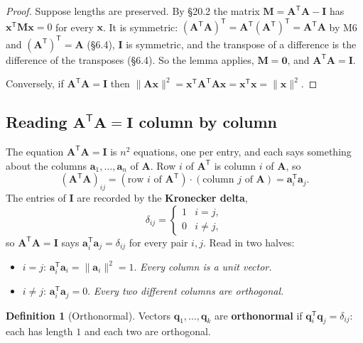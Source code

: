 \documentclass[11pt]{article}
\theoremstyle{plain}
\theoremstyle{definition}
\newtheorem{defn}{Definition}[section]
\theoremstyle{remark}
\newcommand{\vc}[1]{\mathbf{#1}}
\newcommand{\mt}[1]{\mathbf{#1}}
\newcommand{\norm}[1]{\lVert #1\rVert}
\newcommand{\T}{^{\mathsf{T}}}
\begin{document}
\begin{proof}
Suppose lengths are preserved. By \S20.2 the matrix
$\mt{M}=\mt{A}\T\mt{A}-\mt{I}$ has $\vc{x}\T\mt{M}\vc{x}=0$ for every
$\vc{x}$. It is symmetric: $(\mt{A}\T\mt{A})\T=\mt{A}\T(\mt{A}\T)\T=\mt{A}\T\mt{A}$
by M6 and $(\mt{A}\T)\T=\mt{A}$ (\S6.4), $\mt{I}$ is symmetric, and the
transpose of a difference is the difference of the transposes (\S6.4). So the
lemma applies, $\mt{M}=\mt{0}$, and $\mt{A}\T\mt{A}=\mt{I}$.

Conversely, if $\mt{A}\T\mt{A}=\mt{I}$ then
$\norm{\mt{A}\vc{x}}^{2}=\vc{x}\T\mt{A}\T\mt{A}\vc{x}=\vc{x}\T\vc{x}=\norm{\vc{x}}^{2}$.
\end{proof}

\subsection{Reading \texorpdfstring{$\mt{A}\T\mt{A}=\mt{I}$}{A'A = I} column by column}
The equation $\mt{A}\T\mt{A}=\mt{I}$ is $n^{2}$ equations, one per entry, and
each says something about the columns $\vc{a}_1,\dots,\vc{a}_n$ of $\mt{A}$.
Row $i$ of $\mt{A}\T$ is column $i$ of $\mt{A}$, so
\[
  (\mt{A}\T\mt{A})_{ij}
  =(\text{row } i \text{ of } \mt{A}\T)\cdot(\text{column } j \text{ of } \mt{A})
  =\vc{a}_i\T\vc{a}_j .
\]
The entries of $\mt{I}$ are recorded by the \textbf{Kronecker delta},
\[
  \delta_{ij}=\begin{cases}1 & i=j,\\ 0 & i\neq j,\end{cases}
\]
so $\mt{A}\T\mt{A}=\mt{I}$ says $\vc{a}_i\T\vc{a}_j=\delta_{ij}$ for every pair
$i,j$. Read in two halves:
\begin{itemize}[leftmargin=1.4em,itemsep=3pt]
  \item $i=j$: $\vc{a}_i\T\vc{a}_i=\norm{\vc{a}_i}^{2}=1$. \emph{Every column is
        a unit vector.}
  \item $i\neq j$: $\vc{a}_i\T\vc{a}_j=0$. \emph{Every two different columns
        are orthogonal.}
\end{itemize}

\begin{defn}[Orthonormal]
Vectors $\vc{q}_1,\dots,\vc{q}_k$ are \textbf{orthonormal} if
$\vc{q}_i\T\vc{q}_j=\delta_{ij}$: each has length $1$ and each two are
orthogonal.
\end{defn}
\end{document}

